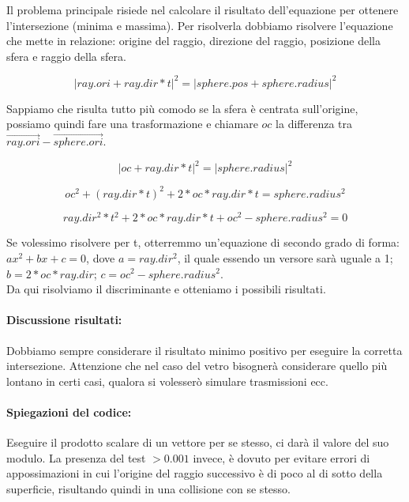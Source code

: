 \documentclass{article}
\begin{document}
Il problema principale risiede nel calcolare il risultato dell'equazione per ottenere l'intersezione (minima e massima).
Per risolverla dobbiamo risolvere l'equazione che mette in relazione: origine del raggio, direzione del raggio, posizione della sfera e raggio della sfera.

$$| ray.ori + ray.dir * t | ^ 2 = | sphere.pos + sphere.radius | ^ 2$$

Sappiamo che risulta tutto più comodo se la sfera è centrata sull'origine, possiamo quindi fare una trasformazione e chiamare $oc$ la differenza tra $\vec{ray.ori} - \vec{sphere.ori}$.

$$| oc + ray.dir * t | ^ 2 = | sphere.radius | ^ 2$$

$$oc^2 + (ray.dir * t) ^ 2 + 2*oc*ray.dir*t = sphere.radius ^ 2$$

$$ray.dir^2 * t^2 + 2*oc*ray.dir*t + oc^2 - sphere.radius ^ 2 = 0$$

Se volessimo risolvere per t, otterremmo un'equazione di secondo grado di forma: $ax^2 + bx + c = 0$, dove $a = ray.dir^2$, il quale essendo un versore sarà uguale a 1; $b = 2*oc*ray.dir$; $c = oc^2 - sphere.radius^2$. 
\\
Da qui risolviamo il discriminante e otteniamo i possibili risultati.
\paragraph{Discussione risultati:} Dobbiamo sempre considerare il risultato minimo positivo per eseguire la corretta intersezione. Attenzione che nel caso del vetro bisognerà considerare quello più lontano in certi casi, qualora si volesserò simulare trasmissioni ecc.
\paragraph{Spiegazioni del codice:} Eseguire il prodotto scalare di un vettore per se stesso, ci darà il valore del suo modulo. La presenza del test $> 0.001$ invece, è dovuto per evitare errori di appossimazioni in cui l'origine del raggio successivo è di poco al di sotto della superficie, risultando quindi in una collisione con se stesso.
\end{document}
